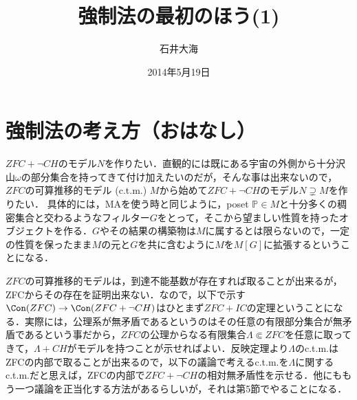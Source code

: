 \documentclass[a4j]{bxjsarticle}
\title{強制法の最初のほう(1)}
\author{石井大海}
\date{2014年5月19日}
\begin{document}
\maketitle
\section{強制法の考え方（おはなし）}
$ZFC + \neg CH$のモデル$N$を作りたい．直観的には既にある宇宙の外側から十分沢山$\omega$の部分集合を持ってきて付け加えたいのだが，そんな事は出来ないので，$ZFC$の可算推移的モデル (c.t.m.) $M$から始めて$ZFC+\neg CH$のモデル$N \supsetneq M$を作りたい．
具体的には，MAを使う時と同じように，poset $\mathbb{P} \in M$と十分多くの稠密集合と交わるようなフィルター$G$をとって，そこから望ましい性質を持ったオブジェクトを作る．$G$やその結果の構築物は$M$に属するとは限らないので，一定の性質を保ったまま$M$の元と$G$を共に含むように$M$を$M[G]$に拡張するということになる．

$ZFC$の可算推移的モデルは，到達不能基数が存在すれば取ることが出来るが，ZFCからその存在を証明出来ない．なので，以下で示す$\Con(ZFC) \rightarrow \Con(ZFC+\neg CH)$はひとまず$ZFC+IC$の定理ということになる．実際には，公理系が無矛盾であるというのはその任意の有限部分集合が無矛盾であるという事だから，$ZFC$の公理からなる有限集合$\Lambda \Subset ZFC$を任意に取ってきて，$\Lambda + CH$がモデルを持つことが示せればよい．反映定理より$\Lambda$のc.t.m.はZFCの内部で取ることが出来るので，以下の議論で考えるc.t.m.を$\Lambda$に関するc.t.m.だと思えば，ZFCの内部で$ZFC+\neg CH$の相対無矛盾性を示せる．他にももう一つ議論を正当化する方法があるらしいが，それは第5節でやることになる．
\end{document}
